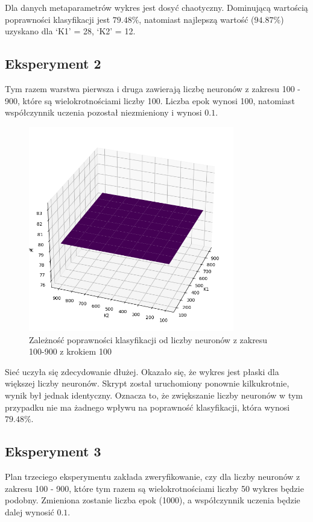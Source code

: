 \documentclass[a4paper]{article}
\begin{document}
Dla danych metaparametrów wykres jest dosyć chaotyczny.
Dominującą wartością poprawności klasyfikacji jest $79.48\%$, natomiast najlepszą wartość ($94.87\%$) uzyskano dla `K1' = 28, `K2' = 12.

\newpage
\subsection{Eksperyment 2}
Tym razem warstwa pierwsza i druga zawierają liczbę neuronów z zakresu 100 - 900, które są wielokrotnościami liczby 100.
Liczba epok wynosi 100, natomiast współczynnik uczenia pozostał niezmieniony i wynosi $0.1$.
\begin{figure}[H]
    \centering
    \includegraphics[width=0.8\textwidth, keepaspectratio]{pictures/k1_k2_dobre_900k1k2_echo100.png}
    \caption{Zależność poprawności klasyfikacji od liczby neuronów z zakresu 100-900 z krokiem 100}
    \label{fig:k1k2_2}
\end{figure}

Sieć uczyła się zdecydowanie dłużej.
Okazało się, że wykres jest płaski dla większej liczby neuronów.
Skrypt został uruchomiony ponownie kilkukrotnie, wynik był jednak identyczny.
Oznacza to, że zwiększanie liczby neuronów w tym przypadku nie ma żadnego wpływu na poprawność klasyfikacji, która wynosi $79.48\%$.

\newpage
\subsection{Eksperyment 3}
Plan trzeciego eksperymentu zakłada zweryfikowanie, czy dla liczby neuronów z zakresu 100 - 900, które tym razem są wielokrotnościami liczby 50 wykres będzie podobny.
Zmieniona zostanie liczba epok (1000), a współczynnik uczenia będzie dalej wynosić $0.1$.
\end{document}
